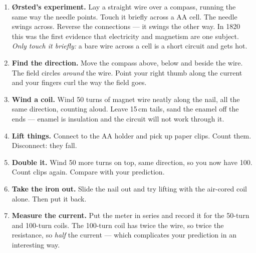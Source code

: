\begin{enumerate}
\item \textbf{Ørsted's experiment.} Lay a straight wire over a compass, running
  the same way the needle points. Touch it briefly across a AA cell. The needle
  swings across. Reverse the connections --- it swings the other way. In 1820
  this was the first evidence that electricity and magnetism are one subject.
  \emph{Only touch it briefly:} a bare wire across a cell is a short circuit and
  gets hot.
\item \textbf{Find the direction.} Move the compass above, below and beside the
  wire. The field circles \emph{around} the wire. Point your right thumb along
  the current and your fingers curl the way the field goes.
\item \textbf{Wind a coil.} Wind 50 turns of magnet wire neatly along the nail,
  all the same direction, counting aloud. Leave 15\,cm tails, sand the enamel
  off the ends --- enamel is insulation and the circuit will not work through
  it.
\item \textbf{Lift things.} Connect to the AA holder and pick up paper clips.
  Count them. Disconnect: they fall.
\item \textbf{Double it.} Wind 50 more turns on top, same direction, so you now
  have 100. Count clips again. Compare with your prediction.
\item \textbf{Take the iron out.} Slide the nail out and try lifting with the
  air-cored coil alone. Then put it back.
\item \textbf{Measure the current.} Put the meter in series and record it for
  the 50-turn and 100-turn coils. The 100-turn coil has twice the wire, so twice
  the resistance, so \emph{half} the current --- which complicates your
  prediction in an interesting way.
\end{enumerate}


\begin{center}
\end{center}

